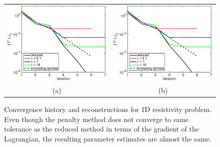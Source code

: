 \documentclass{iopart}
\begin{document}
\begin{figure}
\centering
\begin{tabular}{cc}
\includegraphics[scale=.4]{./figs/1D_exp1_a}&
\includegraphics[scale=.4]{./figs/1D_exp1_b}\\
{\small (a)}&{\small (b)}\\
\end{tabular}
\caption{Convergence history and reconstructions for 1D resistivity problem. Even though the penalty method does not converge to same tolerance as the reduced method in terms of the gradient of the Lagrangian, the resulting parameter estimates are almost the same.}
\label{fig:1D_exp1}
\end{figure}
\end{document}
